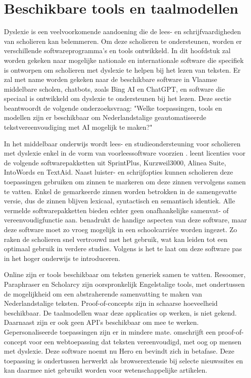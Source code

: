\section{Beschikbare tools en taalmodellen}

Dyslexie is een veelvoorkomende aandoening die de lees- en schrijfvaardigheden van scholieren kan belemmeren. Om deze scholieren te ondersteunen, worden er verschillende softwareprogramma's en tools ontwikkeld. In dit hoofdstuk zal worden gekeken naar mogelijke nationale en internationale software die specifiek is ontworpen om scholieren met dyslexie te helpen bij het lezen van teksten. Er zal met name worden gekeken naar de beschikbare software in Vlaamse middelbare scholen, chatbots, zoals Bing AI en ChatGPT, en software die speciaal is ontwikkeld om dyslexie te ondersteunen bij het lezen. Deze sectie beantwoordt de volgende onderzoeksvraag: "Welke toepassingen, tools en modellen zijn er beschikbaar om Nederlandstalige geautomatiseerde tekstvereenvoudiging met AI mogelijk te maken?"

\medspace

In het middelbaar onderwijs wordt lees- en studieondersteuning voor scholieren met dyslexie enkel in de vorm van voorleessoftware voorzien \autocite{DeCraemer2018, OnderwijsVlaanderen2023}. \textcite{OnderwijsVlaanderen2023} leent licenties voor de volgende softwarepakketten uit SprintPlus, Kurzweil3000, Alinea Suite, IntoWords en TextAid. Naast luister- en schrijfopties kunnen scholieren deze toepassingen gebruiken om zinnen te markeren om deze zinnen vervolgens samen te vatten. Enkel de gemarkeerde zinnen worden betrokken in de samengevatte versie, dus de zinnen blijven lexicaal, syntactisch en semantisch identiek. Alle vermelde softwarepakketten bieden echter geen onafhankelijke samenvat- of vereenvoudigfunctie aan. \textcite{Tops2018} benadrukt de handige aspecten van deze software, maar deze software moet zo vroeg mogelijk in een schoolcarriére worden ingezet. Zo raken de scholieren snel vertrouwd met het gebruik, wat kan leiden tot een optimaal gebruik in verdere studies. Volgens \textcite{Tops2018} is het te laat om deze software pas in het hoger onderwijs te introduceren.

\medspace

Online zijn er tools beschikbaar om teksten generiek samen te vatten. Resoomer, Paraphraser en Scholarcy zijn oorspronkelijk Engelstalige tools, met ondertussen de mogelijkheid om een abstraherende samenvatting te maken van Nederlandstalige teksten. Proof-of-concepts zijn in schaarse hoeveelheid beschikbaar. De taalmodellen waar deze applicaties op werken, is niet gekend. Daarnaast zijn er ook geen API's beschikbaar om mee te werken. Gepersonaliseerde toepassingen zijn er in mindere mate. \textcite{Bingel2018} omschrijft een proof-of-concept voor een webtoepassing dat teksten vereenvoudigd, met oog op mensen met dyslexie. Deze software noemt nu Hero en bevindt zich in betafase. Deze toepassing is ondertussen herwerkt als browserextensie bij selecte nieuwssites en kan daarmee niet gebruikt worden voor wetenschappelijke artikelen.

